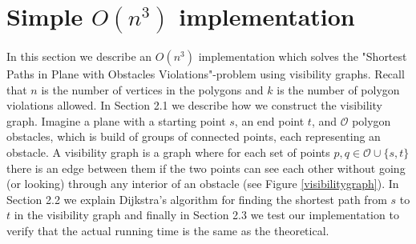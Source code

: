\chapter{Simple $O(n^3)$ implementation}
In this section we describe an $O(n^3)$ implementation which solves the
"Shortest Paths in Plane with Obstacles Violations"-problem using visibility
graphs. Recall that $n$ is
the number of vertices in the polygons and $k$ is the number of polygon
violations allowed. In Section 2.1 we describe how we construct the
visibility graph. Imagine a plane with a starting point $s$, an end point $t$,
and $\mathcal{O}$ polygon obstacles, which is build of groups of connected points,
each representing an obstacle. A visibility graph is a graph where for each set of
points $p,q\in \mathcal{O} \cup \{s,t\}$  there is an edge between them if the 
two points can see each other
without going (or looking) through any interior of an obstacle (see Figure
\ref{visibilitygraph}). In Section 2.2 we explain Dijkstra's algorithm
for finding the shortest path from $s$ to $t$ in the visibility graph and
finally in Section 2.3 we test our implementation to verify that the actual 
running time is the same as the theoretical.


